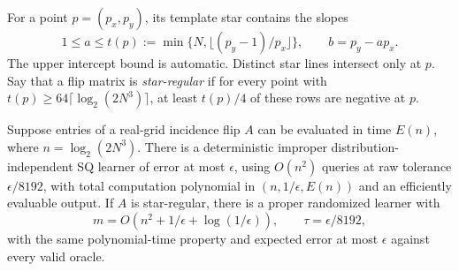 For a point $p=(p_x,p_y)$, its template star contains the slopes
\[
 1\le a\le t(p):=\min\{N,\lfloor(p_y-1)/p_x\rfloor\},
 \qquad b=p_y-ap_x.
\]
The upper intercept bound is automatic. Distinct star lines intersect only at $p$. Say that a flip matrix is \emph{star-regular} if for every point with $t(p)\ge64\lceil\log_2(2N^3)\rceil$, at least $t(p)/4$ of these rows are negative at $p$.

\begin{samepage}
\begin{theorem}\label{thm:fast}
Suppose entries of a real-grid incidence flip $A$ can be evaluated in time $E(n)$, where $n=\log_2(2N^3)$. There is a deterministic improper distribution-independent SQ learner of error at most $\epsilon$, using $O(n^2)$ queries at raw tolerance $\epsilon/8192$, with total computation polynomial in $(n,1/\epsilon,E(n))$ and an efficiently evaluable output. If $A$ is star-regular, there is a proper randomized learner with
\[
 m=O(n^2+1/\epsilon+\log(1/\epsilon)),\qquad
 \tau=\epsilon/8192,
\]
with the same polynomial-time property and expected error at most $\epsilon$ against every valid oracle.
\end{theorem}
\end{samepage}
